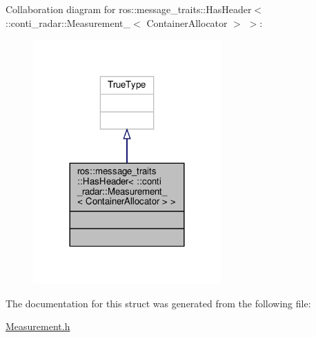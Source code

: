 Collaboration diagram for ros\+:\+:message\+\_\+traits\+:\+:Has\+Header$<$ \+:\+:conti\+\_\+radar\+:\+:Measurement\+\_\+$<$ Container\+Allocator $>$ $>$\+:\nopagebreak
\begin{figure}[H]
\begin{center}
\leavevmode
\includegraphics[width=204pt]{d6/d41/structros_1_1message__traits_1_1HasHeader_3_01_1_1conti__radar_1_1Measurement___3_01ContainerAllocator_01_4_01_4__coll__graph}
\end{center}
\end{figure}


The documentation for this struct was generated from the following file\+:\begin{DoxyCompactItemize}
\item 
\hyperlink{Measurement_8h}{Measurement.\+h}\end{DoxyCompactItemize}
